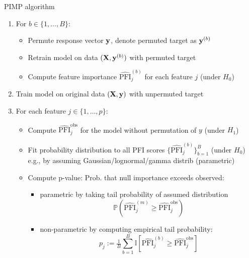 \documentclass[10pt,compress,t,notes=noshow, xcolor=table]{beamer}
\begin{document}
\begin{frame}{PIMP algorithm}

\begin{enumerate}
	\item<1-3> For $b \in \{1, \ldots, B\}$:
		\begin{itemize}
			\item Permute response vector $\mathbf{y}$, denote permuted target as $\mathbf{y}^{(b)}$
			\item Retrain model on data $(\mathbf{X}, \mathbf{y}^{(b)})$ with permuted target 
			\item Compute feature importance $\widehat{\text{PFI}}_j^{(b)}$ for each feature $j$ (under $H_0$)
		\end{itemize}
	\item<2-3> Train model on original data  $(\mathbf{X}, \mathbf{y})$ with unpermuted target
	\item<3> For each feature $j \in \{1,\ldots,p\}$:
		\begin{itemize}
        		\item Compute $\widehat{\text{PFI}}_j^{\text{obs}}$ for the model without permutation of $y$ (under $H_1$)
			\item Fit probability distribution to all PFI scores $\{\widehat{\text{PFI}}_j^{(b)}\}_{b=1}^{B}$ (under $H_0$)\\
            e.g., by assuming Gaussian/lognormal/gamma distrib (parametric)%
			\item Compute p-value: Prob. that null importance exceeds observed: 
            \begin{itemize}
                \item parametric by taking tail probability of assumed distribution $$\mathbb{P}(\widehat{\text{PFI}}_j^{(m)} \geq \widehat{\text{PFI}}_j^{\text{obs}})$$
                \item non-parametric by computing empirical tail probability: 
                $$p_j := \tfrac{1}{B} \textstyle \sum_{b=1}^{B} \mathbb{I}[\widehat{\text{PFI}}_j^{(b)} \geq \widehat{\text{PFI}}_j^{\text{obs}}]$$
            \end{itemize}

		\end{itemize}
\end{enumerate}
\end{frame}
\end{document}
